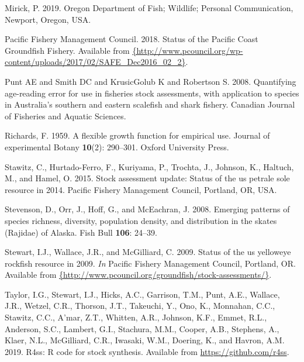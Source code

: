 \documentclass[12pt,]{article}
\begin{document}
\leavevmode\hypertarget{ref-Mirick2019}{}%
Mirick, P. 2019. Oregon Department of Fish; Wildlife; Personal
Communication, Newport, Oregon, USA.

\leavevmode\hypertarget{ref-PFMC2018}{}%
Pacific Fishery Management Council. 2018. Status of the Pacific Coast
Groundfish Fishery. Available from
\href{\%7Bhttp://www.pcouncil.org/wp-content/uploads/2017/02/SAFE_Dec2016_02_2\%7D}{\{http://www.pcouncil.org/wp-content/uploads/2017/02/SAFE\_Dec2016\_02\_2\}}.

\leavevmode\hypertarget{ref-Punt2008}{}%
Punt AE and Smith DC and KrusicGolub K and Robertson S. 2008.
Quantifying age-reading error for use in fisheries stock assessments,
with application to species in Australia's southern and eastern
scalefish and shark fishery. Canadian Journal of Fisheries and Aquatic
Sciences.

\leavevmode\hypertarget{ref-richards1959flexible}{}%
Richards, F. 1959. A flexible growth function for empirical use. Journal
of experimental Botany \textbf{10}(2): 290--301. Oxford University
Press.

\leavevmode\hypertarget{ref-Stawitz2015}{}%
Stawitz, C., Hurtado-Ferro, F., Kuriyama, P., Trochta, J., Johnson, K.,
Haltuch, M., and Hamel, O. 2015. Stock assessment update: Status of the
us petrale sole resource in 2014. Pacific Fishery Management Council,
Portland, OR, USA.

\leavevmode\hypertarget{ref-Stevenson2008}{}%
Stevenson, D., Orr, J., Hoff, G., and McEachran, J. 2008. Emerging
patterns of species richness, diversity, population density, and
distribution in the skates (Rajidae) of Alaska. Fish Bull \textbf{106}:
24--39.

\leavevmode\hypertarget{ref-Stewart2009}{}%
Stewart, I.J., Wallace, J.R., and McGilliard, C. 2009. Status of the us
yelloweye rockfish resource in 2009. \emph{In} Pacific Fishery
Management Council, Portland, OR. Available from
\href{\%7Bhttp://www.pcouncil.org/groundfish/stock-assessments/\%7D}{\{http://www.pcouncil.org/groundfish/stock-assessments/\}}.

\leavevmode\hypertarget{ref-Taylor2019}{}%
Taylor, I.G., Stewart, I.J., Hicks, A.C., Garrison, T.M., Punt, A.E.,
Wallace, J.R., Wetzel, C.R., Thorson, J.T., Takeuchi, Y., Ono, K.,
Monnahan, C.C., Stawitz, C.C., A'mar, Z.T., Whitten, A.R., Johnson,
K.F., Emmet, R.L., Anderson, S.C., Lambert, G.I., Stachura, M.M.,
Cooper, A.B., Stephens, A., Klaer, N.L., McGilliard, C.R., Iwasaki,
W.M., Doering, K., and Havron, A.M. 2019. R4ss: R code for stock
synthesis. Available from \url{https://github.com/r4ss}.
\end{document}
